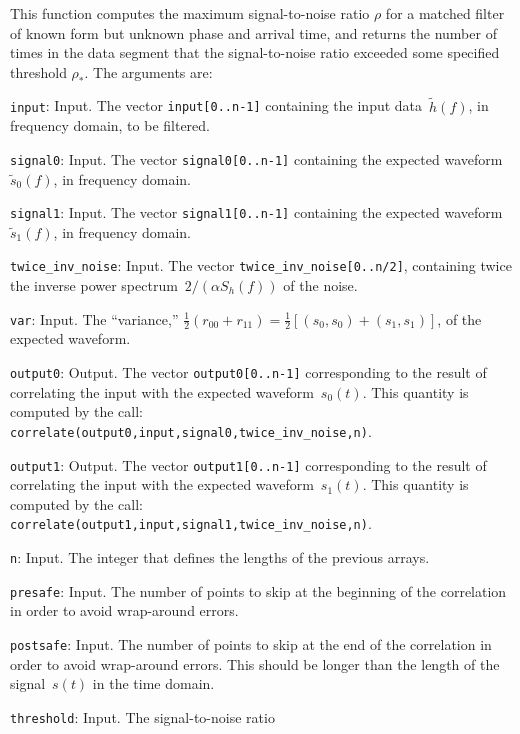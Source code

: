 This function computes the maximum signal-to-noise ratio $\rho$ for a matched
filter of known form but unknown phase and arrival time, and returns
the number of times in the data segment that the signal-to-noise ratio exceeded
some specified threshold $\rho_\ast$.  The arguments are:
\begin{description}
\item{\texttt{input}}: Input.  The vector \texttt{input[0..n-1]} containing
  the input data~$\tilde{h}(f)$, in frequency domain, to be filtered.
\item{\texttt{signal0}}: Input.  The vector \texttt{signal0[0..n-1]} containing
  the expected waveform~$\tilde{s}_0(f)$, in frequency domain.
\item{\texttt{signal1}}: Input.  The vector \texttt{signal1[0..n-1]} containing
  the expected waveform~$\tilde{s}_1(f)$, in frequency domain.
\item{\texttt{twice\_inv\_noise}}: Input.  The vector
  \texttt{twice\_inv\_noise[0..n/2]}, containing twice the inverse power
  spectrum~$2/(\alpha S_h(f))$ of the noise.
\item{\texttt{var}}: Input.  The ``variance,''
  $\frac{1}{2}(r_{00}+r_{11})=\frac{1}{2}[(s_0,s_0)+(s_1,s_1)]$,
  of the expected waveform.
\item{\texttt{output0}}: Output.  The vector \texttt{output0[0..n-1]}
  corresponding to the result of correlating the input with the expected
  waveform~$s_0(t)$.  This quantity is computed by the call:\\
  \texttt{correlate(output0,input,signal0,twice\_inv\_noise,n)}.
\item{\texttt{output1}}: Output.  The vector \texttt{output1[0..n-1]}
  corresponding to the result of correlating the input with the expected
  waveform~$s_1(t)$.  This quantity is computed by the call:\\
  \texttt{correlate(output1,input,signal1,twice\_inv\_noise,n)}.
\item{\texttt{n}}: Input.  The integer that defines the lengths of the
  previous arrays.
\item{\texttt{presafe}}: Input.  The number of points to skip at the beginning
  of the correlation in order to avoid wrap-around errors.
\item{\texttt{postsafe}}: Input.  The number of points to skip at the end
  of the correlation in order to avoid wrap-around errors.  This should be
  longer than the length of the signal~$s(t)$ in the time domain.
\item{\texttt{threshold}}: Input.  The signal-to-noise ratio

\end{description}
